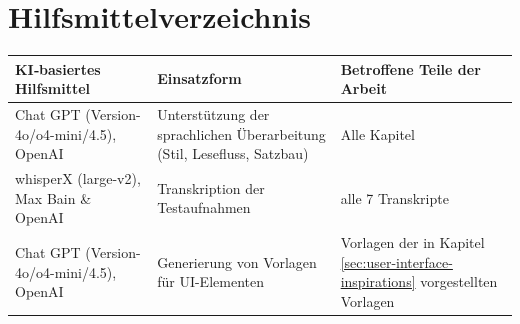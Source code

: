 \documentclass[
	12pt,
	a4paper,
	bibtotoc,
	cleardoubleempty, 
	idxtotoc,
	ngerman,
	openright
	final,
	listof=nochaptergap,
	]{scrbook}
\begin{document}

\singlespacing



\chapter*{Hilfsmittelverzeichnis}

\begin{table}[ht]
\centering
\begin{tabular}{|>{\RaggedRight\arraybackslash}p{4cm}
                |>{\RaggedRight\arraybackslash}p{7cm}
                |>{\RaggedRight\arraybackslash}p{4cm}|}
\hline
\bfseries KI‑basiertes Hilfsmittel 
  & \bfseries Einsatzform 
  & \bfseries Betroffene Teile der Arbeit\\
\hline

Chat GPT (Version-4o/o4-mini/4.5), OpenAI & Unterstützung der sprachlichen Überarbeitung (Stil, Lesefluss, Satzbau) & Alle Kapitel\\
\hline
whisperX (large-v2), Max Bain \& OpenAI & Transkription der Testaufnahmen & alle 7 Transkripte \\
\hline
Chat GPT (Version-4o/o4-mini/4.5), OpenAI & Generierung von Vorlagen für \ac{UI}-Elementen & Vorlagen der in Kapitel \ref{sec:user-interface-inspirations} vorgestellten Vorlagen\\
\hline
\end{tabular}
\end{table}




\let\chaptermark\oldchaptermark
\end{document}
